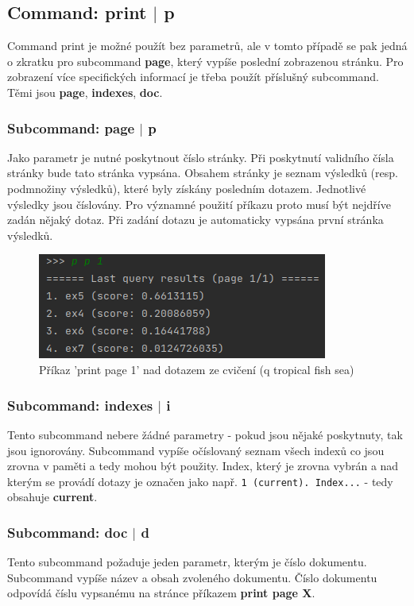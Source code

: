 \documentclass[12pt, letterpaper]{article}
\begin{document}
\subsection{Command: print $|$ p}
Command print je možné použít bez parametrů, ale v tomto případě se pak jedná o zkratku pro subcommand \textbf{page},
který vypíše poslední zobrazenou stránku. Pro zobrazení více specifických informací je třeba použít příslušný
subcommand. Těmi jsou \textbf{page}, \textbf{indexes}, \textbf{doc}.
%
\subsubsection{Subcommand: page $|$ p}
Jako parametr je nutné poskytnout číslo stránky. Při poskytnutí validního čísla stránky bude tato stránka vypsána.
Obsahem stránky je seznam výsledků (resp. podmnožiny výsledků), které byly získány posledním dotazem. Jednotlivé
výsledky jsou číslovány. Pro významné použití příkazu proto musí být nejdříve zadán nějaký dotaz. Při zadání
dotazu je automaticky vypsána první stránka výsledků.

\begin{figure}[H]
    \centering
    \includegraphics[width=\linewidth]{img/p_p}
    \caption{Příkaz 'print page 1' nad dotazem ze cvičení (q tropical fish sea)}
    \label{fig:p_p}
\end{figure}
%
\subsubsection{Subcommand: indexes $|$ i}
Tento subcommand nebere žádné parametry - pokud jsou nějaké poskytnuty, tak jsou ignorovány. Subcommand vypíše
očíslovaný seznam všech indexů co jsou zrovna v paměti a tedy mohou být použity. Index, který je zrovna vybrán a nad
kterým se provádí dotazy je označen jako např. \texttt{1 (current). Index...} - tedy obsahuje \textbf{current}.
%
\subsubsection{Subcommand: doc $|$ d}
Tento subcommand požaduje jeden parametr, kterým je číslo dokumentu. Subcommand vypíše název a obsah zvoleného
dokumentu. Číslo dokumentu odpovídá číslu vypsanému na stránce příkazem \textbf{print page X}.
%
%
\end{document}
